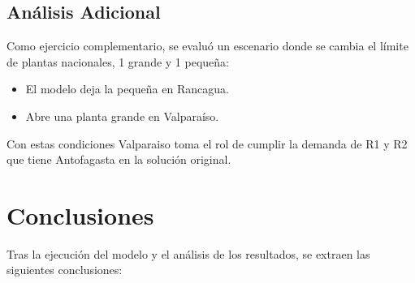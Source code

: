 \documentclass{article}
\begin{document}
\subsection{Análisis Adicional}Como ejercicio complementario, se evaluó un escenario donde se cambia el límite de plantas nacionales, 1 grande y 1 pequeña:
\begin{itemize}
    \item El modelo deja la pequeña en Rancagua.
    \item Abre una planta grande en Valparaíso.
\end{itemize}

Con estas condiciones Valparaiso toma el rol de cumplir la demanda de R1 y R2 que tiene Antofagasta en la solución original.

\section{Conclusiones}
Tras la ejecución del modelo y el análisis de los resultados, se extraen las siguientes conclusiones:
\end{document}
